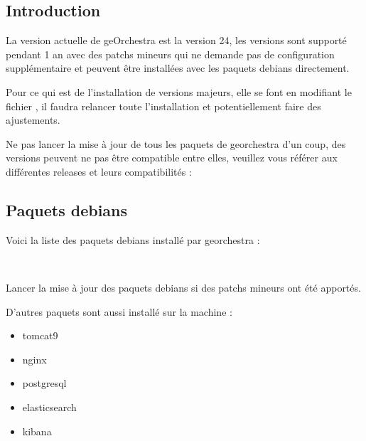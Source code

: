 \documentclass[letterpaper,10pt,french]{sphinxmanual}
\let\sphinxpxdimen\pdfpxdimen\else\newdimen\sphinxpxdimen
\begin{document}
\subsection{Introduction}
\label{\detokenize{doc_instal/maj:introduction}}
\sphinxAtStartPar
La version actuelle de geOrchestra est la version 24, les versions sont supporté pendant 1 an avec des patchs mineurs qui ne demande pas de
configuration supplémentaire et peuvent être installées avec les paquets debians directement.

\sphinxAtStartPar
Pour ce qui est de l’installation de versions majeurs, elle se font en modifiant le fichier ,
il faudra relancer toute l’installation et potentiellement faire des ajustements.

\sphinxAtStartPar
Ne pas lancer la mise à jour de tous les paquets de georchestra d’un coup, des versions peuvent ne pas être compatible entre elles,
veuillez vous référer aux différentes releases et leurs compatibilités : 


\subsection{Paquets debians}
\label{\detokenize{doc_instal/maj:paquets-debians}}
\sphinxAtStartPar
Voici la liste des paquets debians installé par georchestra :

\noindent{\hspace*{\fill}\sphinxincludegraphics[width=700\sphinxpxdimen]{{debian_paquet}.png}\hspace*{\fill}}

\sphinxAtStartPar
 

\sphinxAtStartPar
Lancer la mise à jour des paquets debians si des patchs mineurs ont été apportés.

\sphinxAtStartPar
D’autres paquets sont aussi installé sur la machine :
\begin{itemize}
\item {} 
\sphinxAtStartPar
tomcat9

\item {} 
\sphinxAtStartPar
nginx

\item {} 
\sphinxAtStartPar
postgresql

\item {} 
\sphinxAtStartPar
elasticsearch

\item {} 
\sphinxAtStartPar
kibana

\end{itemize}



\renewcommand{\indexname}{Index}
\printindex
\end{document}
